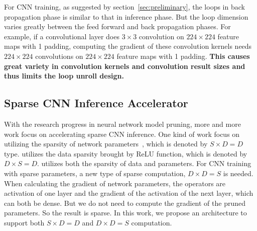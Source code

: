 For CNN training, as suggested by section~\ref{sec:preliminary}, the loops in back propagation phase is similar to that in inference phase. But the loop dimension varies greatly between the feed forward and back propagation phases. For example, if a convolutional layer does $3\times 3$ convolution on $224\times 224$ feature maps with 1 padding, computing the gradient of these convolution kernels needs $224\times 224$ convolutions on $224\times 224$ feature maps with 1 padding. {\bf{This causes great variety in convolution kernels and convolution result sizes and thus limits the loop unroll design.}} 

\subsection{Sparse CNN Inference Accelerator}\label{sec:rw_sparse}
With the research progress in neural network model pruning, more and more work focus on accelerating sparse CNN inference. One kind of work focus on utilizing the sparsity of network parameters~\cite{han2017ese,zhang2016cambricon}, which is denoted by $S\times D=D$ type. \cite{albericio2016cnvlutin} utilizes the data sparsity brought by ReLU function, which is denoted by $D\times S=D$. \cite{han2016eie} utilizes both the sparsity of data and parameters. For CNN training with sparse parameters, a new type of sparse computation, $D\times D=S$ is needed. When calculating the gradient of network parameters, the operators are activation of one layer and the gradient of the activation of the next layer, which can both be dense. But we do not need to compute the gradient of the pruned parameters. So the result is sparse. In this work, we propose an architecture to support both $S\times D=D$ and $D\times D=S$ computation.


